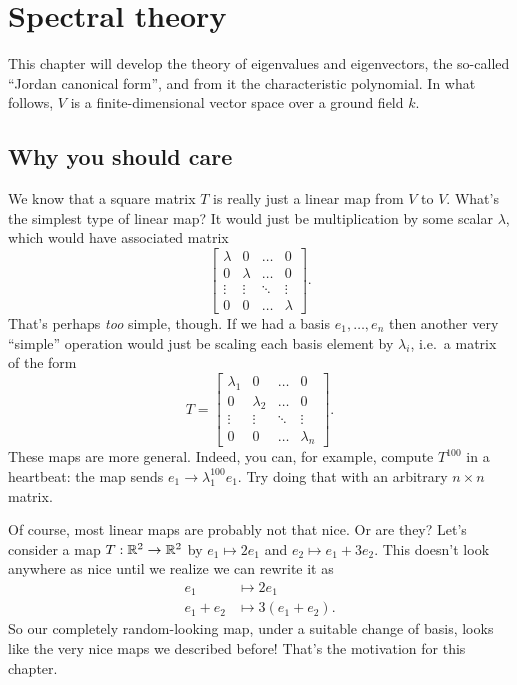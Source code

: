 \chapter{Spectral theory}
This chapter will develop the theory of eigenvalues and eigenvectors, the so-called
``Jordan canonical form'', and from it the characteristic polynomial.
In what follows, $V$ is a finite-dimensional vector space over a ground field $k$.

\section{Why you should care}
We know that a square matrix $T$ is really just
a linear map from $V$ to $V$.
What's the simplest type of linear map?
It would just be multiplication by some scalar $\lambda$,
which would have associated matrix
\[
	\begin{bmatrix}
		\lambda & 0 & \dots & 0 \\
		0 & \lambda & \dots & 0 \\
		\vdots & \vdots & \ddots & \vdots \\
		0 & 0 & \dots & \lambda
	\end{bmatrix}.
\]
That's perhaps \emph{too} simple, though.
If we had a basis $e_1, \dots, e_n$ then another very ``simple'' operation
would just be scaling each basis element by $\lambda_i$,
i.e.\ a  matrix of the form
\[
	T = \begin{bmatrix}
		\lambda_1 & 0 & \dots & 0 \\
		0 & \lambda_2 & \dots & 0 \\
		\vdots & \vdots & \ddots & \vdots \\
		0 & 0 & \dots & \lambda_n
	\end{bmatrix}.
\]
These maps are more general.
Indeed, you can, for example, compute $T^{100}$ in a heartbeat:
the map sends $e_1 \to \lambda_1^{100} e_1$.
Try doing that with an arbitrary $n \times n$ matrix.

Of course, most linear maps are probably not that nice.
Or are they?
Let's consider a map $T : \mathbb R^2 \to \mathbb R^2$
by $e_1 \mapsto 2e_1$ and $e_2 \mapsto e_1+3e_2$.
This doesn't look anywhere as nice until we realize we can rewrite it as
\begin{align*}
	e_1 &\mapsto 2e_1 \\ 
	e_1+e_2 &\mapsto 3(e_1+e_2).
\end{align*}
So our completely random-looking map, under a suitable change of basis,
looks like the very nice maps we described before!
That's the motivation for this chapter.

